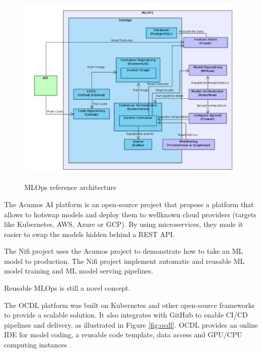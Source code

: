 \begin{figure}[!htbp]
    \caption{MLOps reference architecture\cite{10855428}}
    \centering
    \includegraphics[scale=0.5]{images/infrastructure}
    \label{fig:infra}
\end{figure}


The Acumos AI platform\cite{10690392} is an open-source project that propose a platform that allows to hotswap models and deploy
them to wellknown cloud providers (targets like Kubernetes, AWS, Azure or GCP).
By using microservices, they made it easier to swap the models hidden behind a REST API\@.

The Nifi project\cite{10346079} uses the Acumos project to demonstrate how to take an ML model
to production.
The Nifi project implement automatic and reusable ML model training and ML model serving pipelines.

Reusable MLOps is still a novel concept\cite{10690392}.

The OCDL platform\cite{LIU2020704} was built on Kubernetes and other open-source frameworks to provide a scalable solution.
It also integrates with GitHub to enable CI/CD pipelines and delivery, as illustrated in Figure \ref{fig:ocdl}.
OCDL provides an online IDE for model coding, a reusable code template, data access and GPU/CPU computing instances\cite{LIU2020704} .

